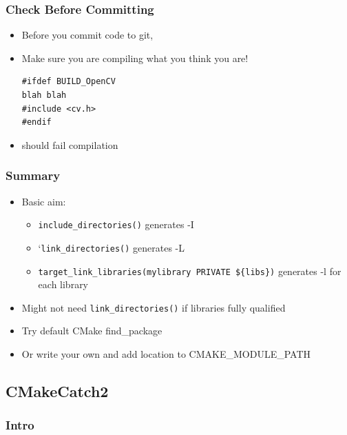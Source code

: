 \subsubsection{Check Before Committing}\label{check-before-committing}

\begin{itemize}
\item
  Before you commit code to git,
\item
  Make sure you are compiling what you think you are!

\begin{verbatim}
#ifdef BUILD_OpenCV
blah blah
#include <cv.h>
#endif
\end{verbatim}
\item
  should fail compilation
\end{itemize}

\subsubsection{Summary}\label{summary-1}

\begin{itemize}
\itemsep1pt\parskip0pt
\item
  Basic aim:

  \begin{itemize}
  \itemsep1pt\parskip0pt
  \item
    \texttt{include\_directories()} generates -I
  \item
    `\texttt{link\_directories()} generates -L
  \item
    \texttt{target\_link\_libraries(mylibrary PRIVATE \$\{libs\})}
    generates -l for each library
  \end{itemize}
\item
  Might not need \texttt{link\_directories()} if libraries fully
  qualified
\item
  Try default CMake find\_package
\item
  Or write your own and add location to CMAKE\_MODULE\_PATH
\end{itemize}

\subsection{CMakeCatch2}\label{cmakecatch2}

\subsubsection{Intro}\label{intro}

